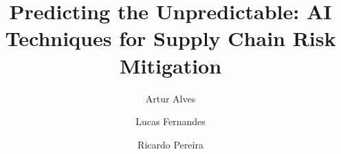 \documentclass[runningheads]{llncs}
\begin{document}
\title{Predicting the Unpredictable: AI Techniques for Supply Chain Risk Mitigation}


\author{
Artur Alves \and
Lucas Fernandes \and
Ricardo Pereira
}



\maketitle










\nocite{renuga2026ai}


\end{document}
